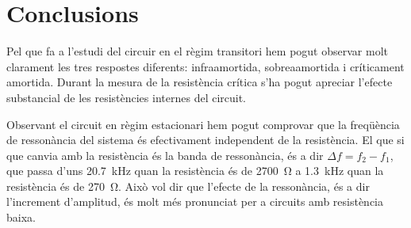 \section{Conclusions}
Pel que fa a l'estudi del circuir en el règim transitori hem pogut observar molt clarament les tres respostes diferents: infraamortida, sobreaamortida i críticament amortida. Durant la mesura de la resistència crítica s'ha pogut apreciar l'efecte substancial de les resistències internes del circuit. 

Observant el circuit en règim estacionari hem pogut comprovar que la freqüència de ressonància del sistema és efectivament independent de la resistència. El que si que canvia amb la resistència és la banda de ressonància, és a dir \( \Delta f = f_2 - f_1 \), que passa d'uns \SI{20.7}{kHz} quan la resistència és de \SI{2700}{\ohm} a \SI{1.3}{kHz} quan la resistència és de \SI{270}{\ohm}. Això vol dir que l'efecte de la ressonància, és a dir l'increment d'amplitud, és molt més pronunciat per a circuits amb resistència baixa. 
